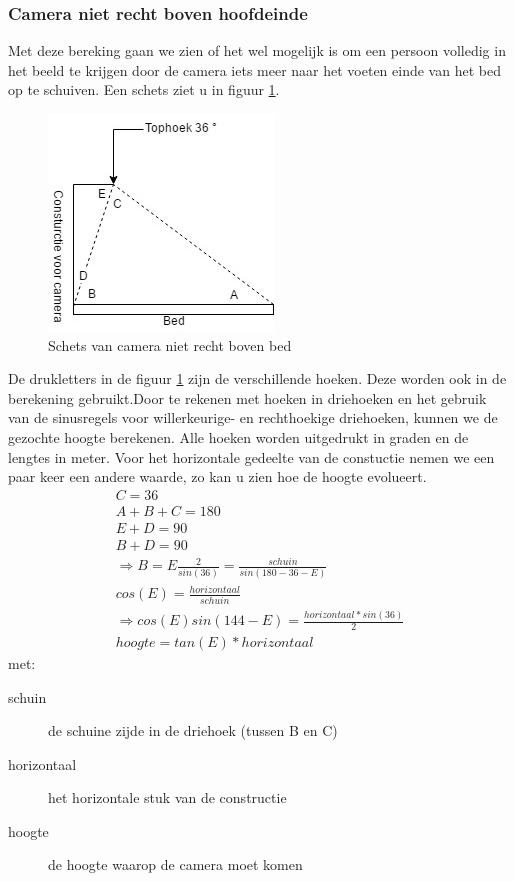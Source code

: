 \subsubsection{Camera niet recht boven hoofdeinde}
Met deze bereking gaan we zien of het wel mogelijk is om een persoon volledig in het beeld te krijgen door de camera iets meer naar het voeten einde van het bed op te schuiven. Een schets ziet u in figuur \ref{imgCNRBB}.
\begin{figure}[h]
	\includegraphics[scale=0.75]{CameraNietRechtBoven}
	\caption{Schets van camera niet recht boven bed}
	\label{imgCNRBB}
\end{figure}
De drukletters in de figuur \ref{imgCNRBB} zijn de verschillende hoeken. Deze worden ook in de berekening gebruikt.Door te rekenen met hoeken in driehoeken en het gebruik van de sinusregels voor willerkeurige- en rechthoekige driehoeken, kunnen we de gezochte hoogte berekenen. Alle hoeken worden uitgedrukt in graden en de lengtes in meter. Voor het horizontale gedeelte van de constuctie nemen we een paar keer een andere waarde, zo kan u zien hoe de hoogte evolueert.
\begin{gather}
	C=36\\
	A+B+C=180 \\
	E+D=90 \\
	B+D=90 \\
	\Rightarrow B=E
	\frac{2}{sin(36)}=\frac{schuin}{sin(180-36-E)}\\
	cos(E)=\frac{horizontaal}{schuin}\\
	\Rightarrow cos(E)sin(144-E)=\frac{horizontaal*sin(36)}{2}\\
	hoogte=tan(E)*horizontaal
\end{gather}
met:
\begin{description}
	\item[schuin] de schuine zijde in de driehoek (tussen B en C)
	\item[horizontaal] het horizontale stuk van de constructie
	\item[hoogte] de hoogte waarop de camera moet komen
\end{description}
